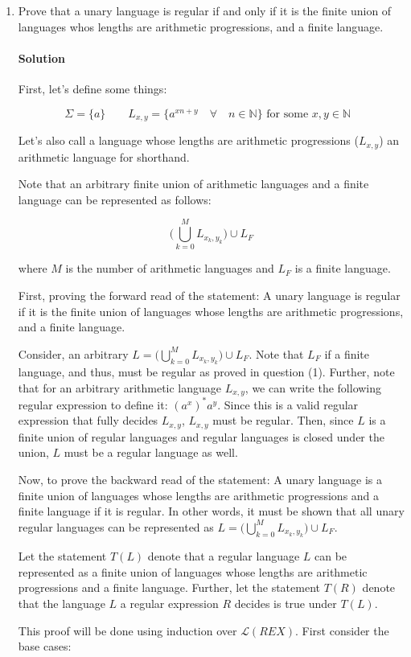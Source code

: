 \documentclass[11pt]{article}
\newcommand{\solution}[1]{\paragraph{Solution}  }
\begin{document}
\begin{enumerate}
    \item Prove that a unary language is regular if and only if it is the finite union of languages whos lengths are arithmetic progressions, and a finite language.

    \solution{} First, let's define some things:

    $$\Sigma = \{a\} \qquad L_{x,y}=\{a^{xn + y} \quad \forall \quad n \in \mathbb{N}\} \text{ for some $x, y \in \mathbb{N}$ }$$

    Let's also call a language whose lengths are arithmetic progressions ($L_{x, y}$) an arithmetic language for shorthand.

    Note that an arbitrary finite union of arithmetic languages and a finite language can be represented as follows:

    $$\big(\bigcup_{k=0}^M L_{x_k, y_k}\big) \cup L_F $$

    where $M$ is the number of arithmetic languages and $L_F$ is a finite language.

    First, proving the forward read of the statement: A unary language is regular if it is the finite union of languages whose lengths are arithmetic progressions, and a finite language.

    Consider, an arbitrary $L = \big(\bigcup_{k=0}^M L_{x_k, y_k}\big) \cup L_F$. Note that $L_F$ if a finite language, and thus, must be regular as proved in question (1). Further, note that for an arbitrary arithmetic language $L_{x, y}$, we can write the following regular expression to define it: $(a^x)^*a^y$. Since this is a valid regular expression that fully decides $L_{x,y}$, $L_{x, y}$ must be regular. Then, since $L$ is a finite union of regular languages and regular languages is closed under the union, $L$ must be a regular language as well.

    Now, to prove the backward read of the statement: A unary language is a finite union of languages whose lengths are arithmetic progressions and a finite language if it is regular. In other words, it must be shown that all unary regular languages can be represented as $L = \big(\bigcup_{k=0}^M L_{x_k, y_k}\big) \cup L_F$. 

    Let the statement $T(L)$ denote that a regular language $L$ can be represented as a finite union of languages whose lengths are arithmetic progressions and a finite language. Further, let the statement $T(R)$ denote that the language $L$ a regular expression $R$ decides is true under $T(L)$.

    This proof will be done using induction over $\mathcal{L}(REX)$. First consider the base cases:


\end{enumerate}
\end{document}
